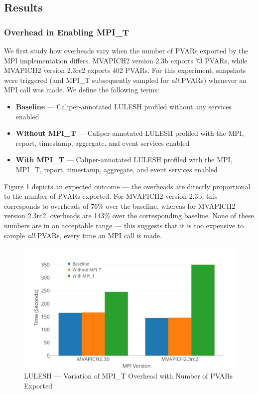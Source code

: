 \subsection{Results}
\subsubsection{Overhead in Enabling MPI\_T}
We first study how overheads vary when the number of PVARs exported by the MPI implementation differs. MVAPICH2 version 2.3b exports 73 PVARs, while MVAPICH2 version 2.3rc2 exports 402 PVARs. For this experiment, snapshots were triggered (and MPI\_T subsequently sampled for \textit{all} PVARs) whenever an MPI call was made. We define the following terms:
\begin{itemize}
\item \textbf{Baseline} --- Caliper-annotated LULESH profiled without any services enabled
\item \textbf{Without MPI\_T} --- Caliper-annotated LULESH profiled with the MPI, report, timestamp, aggregate, and event services enabled
\item \textbf{With MPI\_T} --- Caliper-annotated LULESH profiled with the MPI, MPI\_T, report, timestamp, aggregate, and event services enabled
\end{itemize}
Figure \ref{fig:cali-overhead-version} depicts an expected outcome --- the overheads are directly proportional to the number of PVARs exported. For MVAPICH2 version 2.3b, this corresponds to overheads of 76\% over the baseline, whereas for MVAPICH2 version 2.3rc2, overheads are 143\% over the corresponding baseline. None of these numbers are in an acceptable range --- this suggests that it is too expensive to sample \textit{all} PVARs, every time an MPI call is made.
\begin{center}
	\begin{figure}[bp!]
         \centering
  \captionsetup{justification=centering}
		\includegraphics[scale=0.8, width=\columnwidth, keepaspectratio]{figures/CALIPER_overheads_version}
		\caption{LULESH --- Variation of MPI\_T Overhead with Number of PVARs Exported}
		\label{fig:cali-overhead-version}
	\end{figure}
\end{center}

